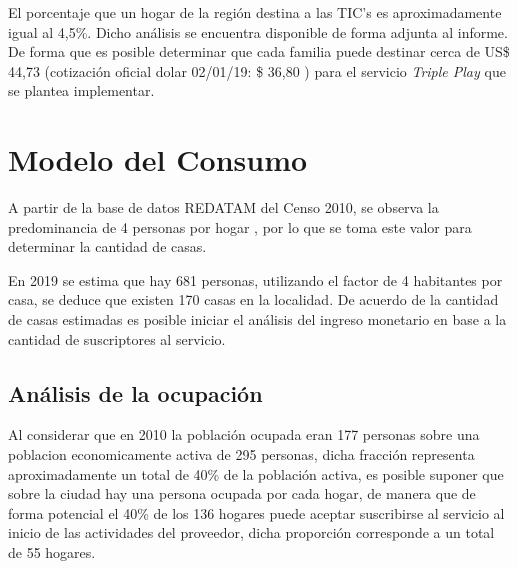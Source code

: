 El porcentaje que un hogar de la región destina a las TIC's es aproximadamente igual al 4,5\%. Dicho análisis se encuentra disponible de forma adjunta al informe. De forma que es posible determinar que cada familia puede destinar cerca de US\$ 44,73 (cotización oficial dolar 02/01/19: \$ 36,80 ) para el servicio \textit{Triple Play} que se plantea implementar.


\section{Modelo del Consumo}

 
A partir de la base de datos REDATAM del Censo 2010, se observa la predominancia de 4 personas por hogar \cite{censo2010-personas}, por lo que se toma este valor para determinar la cantidad de casas.


En 2019 se estima que hay 681 personas, utilizando el factor de 4 habitantes por casa, se deduce que existen 170 casas en la localidad. De acuerdo de la cantidad de casas estimadas es posible iniciar el análisis del ingreso monetario en base a la cantidad de suscriptores al servicio.



\subsection{Análisis de la ocupación}






Al considerar que en 2010 la población ocupada eran 177 personas \cite{censo2010-actividad} sobre una poblacion economicamente activa de 295 personas, dicha fracción representa aproximadamente un total de 40\% de la población activa, es posible suponer que sobre la ciudad hay una persona ocupada por cada hogar, de manera que de forma potencial el 40\% de los 136 hogares puede aceptar suscribirse al servicio al inicio de las actividades del proveedor, dicha proporción corresponde a un total de 55 hogares. 


